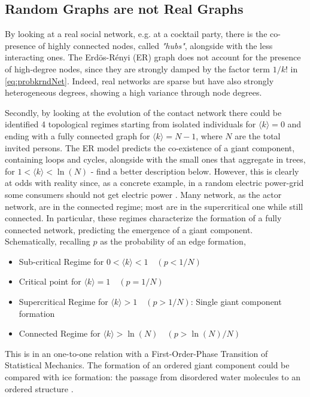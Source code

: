 \documentclass[a4paper,10pt, oneside]{book} %
\theoremstyle{definition}
\begin{document}
\subsection{Random Graphs are not Real Graphs}

By looking at a real social network, e.g. at a cocktail party, there is the co-presence of highly connected nodes, called \textit{"hubs"}, alongside with the less interacting ones. The Erdös-Rényi (ER) graph does not account for the presence of high-degree nodes\cite{barabasi::2016networkbook}, since they are strongly damped by the factor term $1/k!$ in \autoref{eq:probkrndNet}. Indeed, real networks are sparse but have also strongly heterogeneous degrees, showing a high variance through node degrees.

Secondly, by looking at the evolution of the contact network there could be identified 4 topological regimes starting from isolated individuals for $\langle k \rangle = 0$ and ending with a fully connected graph for $\langle k \rangle = N-1$, where $N$ are the total invited persons. The ER model predicts the co-existence of a giant component, containing loops and cycles, alongside with the small ones that aggregate in trees, for $1 < \langle k\rangle < \ln(N)$ - find a better description below. However, this is clearly at odds with reality since, as a concrete example, in a random electric power-grid some consumers should not get electric power \cite{barabasi::2016networkbook}. Many network, as the actor network, are in the connected regime; most are in the supercritical one while still connected.
In particular, these regimes characterize the formation of a fully connected network, predicting the emergence of a giant component.
\newline Schematically, recalling $ p$ as the probability of an edge formation,
\begin{itemize}[noitemsep]
	\item Sub-critical Regime for $0 < \langle k \rangle < 1 \quad (p < 1/N)$ 
	\item Critical point for $\langle k \rangle = 1 \quad (p = 1/N)$
	\item Supercritical Regime for $\langle k \rangle > 1 \quad (p > 1/N)$: Single giant component formation
	\item Connected Regime for $\langle k \rangle > \ln(N) \quad (p > \ln(N)/N)$
\end{itemize}
This is in an one-to-one relation with a First-Order-Phase Transition of Statistical Mechanics. The formation of an ordered giant component could be compared with ice formation: the passage from disordered water molecules to an ordered structure \cite{barabasi::2016networkbook}.
\end{document}

